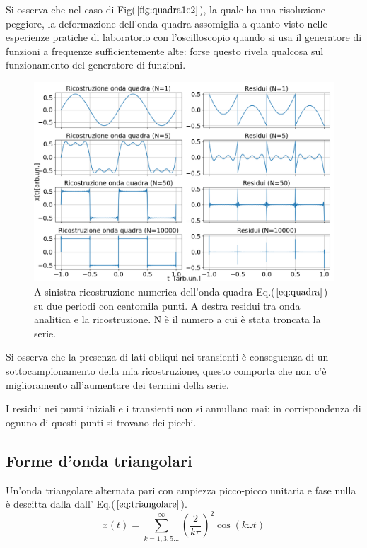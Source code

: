 \documentclass{article}
\begin{document}
        Si osserva che nel caso di Fig($\ref{fig:quadra1e2}$), la quale ha una risoluzione 
        peggiore, la deformazione dell'onda quadra assomiglia a quanto visto nelle esperienze 
        pratiche di laboratorio con l'oscilloscopio quando si usa il generatore di funzioni a
        frequenze sufficientemente alte: forse questo rivela qualcosa sul funzionamento del generatore
        di funzioni.\\

        \begin{figure}[H]
            \centering
            \includegraphics[width=1.2\textwidth]{fousquarewave1e5.png} %
            \caption{A sinistra ricostruzione numerica dell'onda quadra Eq.($\ref{eq:quadra}$) su
                    due periodi con centomila punti.
                    A destra residui tra onda analitica e la ricostruzione.
                    N è il numero a cui è stata troncata la serie.}            \label{fig:quadra1e5}
        \end{figure}  
        
        
        Si osserva che la presenza di lati obliqui nei transienti è conseguenza di un sottocampionamento
        della mia ricostruzione, questo comporta che non c'è miglioramento all'aumentare dei termini 
        della serie.

        I residui nei punti iniziali e i transienti non si annullano mai: in corrispondenza di ognuno di
        questi punti si trovano dei picchi.




    \subsection{Forme d'onda triangolari}
        Un'onda triangolare alternata pari con ampiezza picco-picco unitaria e fase nulla è descitta dalla
        dall' Eq.($\ref{eq:triangolare}$).
        \begin{equation}
            x(t) = \sum_{k=1,3,5...}^{\infty} \left(\frac{2}{k\pi}\right)^{2}\cos\left(k\omega t\right)
            \label{eq:triangolare}
        \end{equation}
\end{document}
